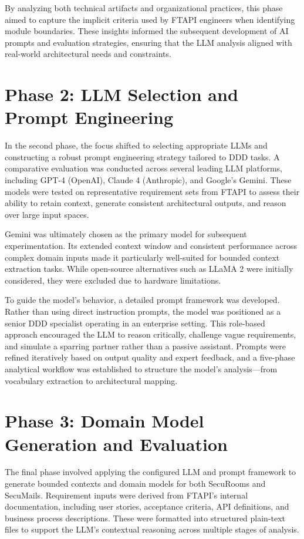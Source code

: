 By analyzing both technical artifacts and organizational practices, this phase aimed to capture the implicit criteria used by FTAPI engineers when identifying module boundaries. These insights informed the subsequent development of AI prompts and evaluation strategies, ensuring that the LLM analysis aligned with real-world architectural needs and constraints.

\section{Phase 2: LLM Selection and Prompt Engineering}

In the second phase, the focus shifted to selecting appropriate LLMs and constructing a robust prompt engineering strategy tailored to DDD tasks. A comparative evaluation was conducted across several leading LLM platforms, including GPT-4 (OpenAI), Claude 4 (Anthropic), and Google's Gemini. These models were tested on representative requirement sets from FTAPI to assess their ability to retain context, generate consistent architectural outputs, and reason over large input spaces.

Gemini was ultimately chosen as the primary model for subsequent experimentation. Its extended context window and consistent performance across complex domain inputs made it particularly well-suited for bounded context extraction tasks. While open-source alternatives such as LLaMA 2 were initially considered, they were excluded due to hardware limitations.

To guide the model's behavior, a detailed prompt framework was developed. Rather than using direct instruction prompts, the model was positioned as a senior DDD specialist operating in an enterprise setting. This role-based approach encouraged the LLM to reason critically, challenge vague requirements, and simulate a sparring partner rather than a passive assistant. Prompts were refined iteratively based on output quality and expert feedback, and a five-phase analytical workflow was established to structure the model's analysis—from vocabulary extraction to architectural mapping.

\section{Phase 3: Domain Model Generation and Evaluation}

The final phase involved applying the configured LLM and prompt framework to generate bounded contexts and domain models for both SecuRooms and SecuMails. Requirement inputs were derived from FTAPI's internal documentation, including user stories, acceptance criteria, API definitions, and business process descriptions. These were formatted into structured plain-text files to support the LLM's contextual reasoning across multiple stages of analysis.

